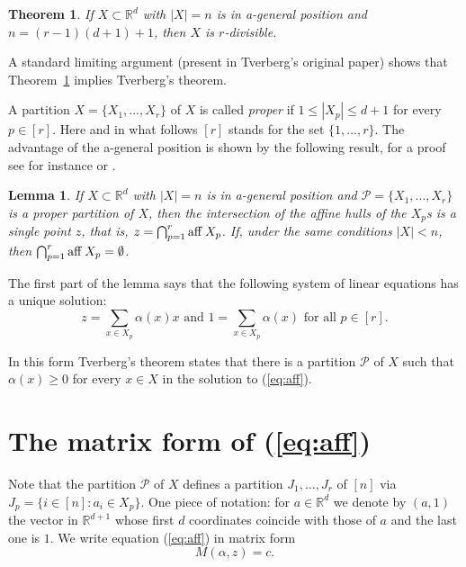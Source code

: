 \documentclass[12pt,a4paper]{amsart}
\newtheorem{theorem}{Theorem}[section]
\newtheorem{lemma}{Lemma}[section]
\newcommand{\al}{\alpha}
\newcommand{\R}{\mathbb{R}}
\newcommand{\p}{\mathcal{P}}
\newcommand{\aff}{\textrm{aff\;}}
\numberwithin{equation}{section}
\begin{document}
\begin{theorem}\label{th:Tva-gen} If $X\subset \R^d$ with $|X|=n$ is in a-general position and $n=(r-1)(d+1)+1$, then $X$ is $r$-divisible.
\end{theorem}

A standard limiting argument (present in Tverberg's original paper) shows that Theorem~\ref{th:Tva-gen} implies Tverberg's theorem.

\smallskip
A partition $X=\{X_1,\ldots,X_r\}$ of $X$ is called {\sl proper} if $1\le |X_p|\le d+1$ for every $p \in [r]$. Here and in what follows $[r]$ stands for the set $\{1,\ldots,r\}$. The advantage of the a-general position is shown by the following result, for a proof see for instance \cite{Bar} or \cite{BarSob}.

\begin{lemma}\label{l:cap}If $X\subset \R^d$ with $|X|=n$ is in a-general position and $\p=\{X_1,\ldots,X_r\}$ is a proper partition of $X$, then the intersection of the affine hulls of the $X_p$s is a single point $z$, that is, $z=\bigcap_{p=1}^r \aff X_p$. If, under the same conditions $|X|<n$, then $\bigcap_{p=1}^r \aff X_p=\emptyset$.
\end{lemma}

The first part of the lemma says that the following system of linear equations has a unique solution:
\begin{equation}\label{eq:aff}
z=\sum_{x\in X_p}\al(x)x \mbox{ and }1=\sum_{x\in X_p}\al(x) \mbox{ for all }p \in [r].
\end{equation}

In this form Tverberg's theorem states that there is a partition $\p$ of $X$ such that $\al(x)\ge 0$ for every $x\in X$ in the solution to  (\ref{eq:aff}).

\section{The matrix form of (\ref{eq:aff})}\label{sec:matrix}

Note that the partition $\p$ of $X$ defines a partition $J_1,\ldots,J_r$ of $[n]$ via $J_p=\{i\in [n]: a_i\in X_p\}.$ One piece of notation: for $a \in \R^d$ we denote by $(a,1)$ the vector in $\R^{d+1}$ whose first $d$ coordinates coincide with those of $a$ and the last one is $1$. We write equation (\ref{eq:aff}) in matrix form
\begin{equation}\label{matrix}
M(\al,z) =c.
\end{equation}
\end{document}
